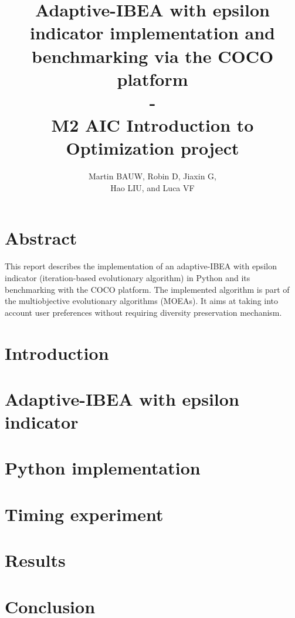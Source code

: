 \documentclass[12pt]{article}
\date{}
\begin{document}
\title{Adaptive-IBEA with epsilon indicator implementation and benchmarking via the COCO platform \\ \-- \\ M2 AIC Introduction to Optimization project}
\author{Martin BAUW, Robin D, Jiaxin G,\\ Hao LIU, and Luca VF}
\maketitle

\tableofcontents

\newpage

\section{Abstract}

This report describes the implementation of an adaptive-IBEA with epsilon indicator (iteration-based evolutionary algorithm) in Python and its benchmarking with the COCO platform. The implemented algorithm is part of the multiobjective evolutionary algorithms (MOEAs). It aims at taking into account user preferences without requiring diversity preservation mechanism.

\section{Introduction}

\section{Adaptive-IBEA with epsilon indicator}

\section{Python implementation}

\section{Timing experiment}

\section{Results}

\section{Conclusion}
\end{document}
